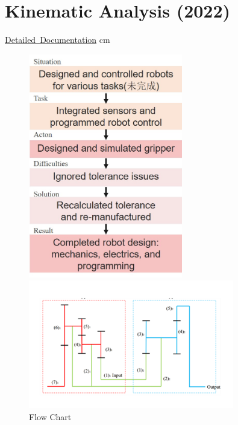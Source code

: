 \documentclass[10pt, letterpaper]{article}
\let\hrefWithoutArrow\href
\renewcommand{\href}[2]{\hrefWithoutArrow{#1}{\ifthenelse{\equal{#2}{}}{ }{#2 }\raisebox{.15ex}{\footnotesize \faExternalLink*}}}
\begin{document}
    \section{Kinematic Analysis (2022)}

    \normalsize
    \mbox{\hrefWithoutArrow{https://github.com/liu092111/College_Portfolio/blob/5ad988d0433266a348382bcdb4a4998478eef397/Mechanical\%20Design/\%E6\%A9\%9F\%E6\%A2\%B0\%E8\%A8\%AD\%E8\%A8\%88\%E6\%9C\%9F\%E6\%9C\%AB\%E6\%9B\%B8\%E9\%9D\%A2\%E5\%A0\%B1\%E5\%91\%8A.pdf}{{\footnotesize\faLink}\hspace*{0.13cm}Detailed Documentation}}%
     cm%
    
    \begin{figure}[!b]
        \vspace{-0.8 cm} 
        \begin{minipage}[c]{0.33\linewidth}
            \centering
            \includegraphics[width=0.6\textwidth]{fig/Mechanical Design/Mechanical Design Flow Chart.jpg}
            \caption{Flow Chart}
        \end{minipage}%
        \begin{minipage}[c]{0.33\linewidth}
            \centering
            \includegraphics[width=0.8\textwidth]{fig/Mechanical Design/齒輪系示意圖.png}

\end{minipage}
\end{figure}
\end{document}
